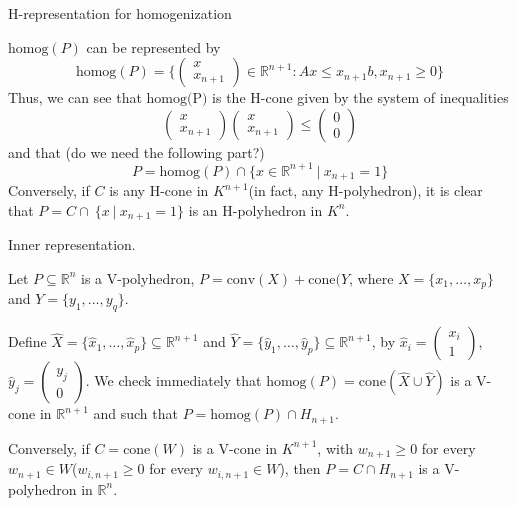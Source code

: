 \documentclass{article}
\def\R{{\mathbb R}}
\begin{document}
H-representation for homogenization

$\mbox{homog}(P)$ can be represented by
\begin{equation}
\mbox{homog}(P)=\{\begin{pmatrix}x\\x_{n+1}\end{pmatrix}\in\R^{n+1}:Ax\leq x_{n+1}b,x_{n+1}\geqslant 0\}
\end{equation}
Thus, we can see that $\mbox{homog(P)}$ is the H-cone given by the system of inequalities 
\begin{equation}
\begin{pmatrix}x\\x_{n+1}\end{pmatrix}\begin{pmatrix}x\\x_{n+1}\end{pmatrix}\leqslant \begin{pmatrix}0\\0\end{pmatrix}
\end{equation}
and that (do we need the following part?)
\begin{equation}
P=\mbox{homog}(P)\cap \{x\in\R^{n+1}~|~x_{n+1}=1\}
\end{equation}
Conversely, if $C$ is any H-cone in $K^{n+1}$(in fact, any H-polyhedron), it is clear that $P=C\cap\ \{x~|~x_{n+1}=1\}$ is an H-polyhedron in $K^n$.


Inner representation.

Let $P\subseteq\R^n$ is a V-polyhedron, $P=\mbox{conv}(X)+\mbox{cone}(Y$, where $X=\{x_1,\dots,x_p\}$ and $Y=\{y_1,\dots, y_q\}$.

Define $\hat{X}=\{\hat{x}_1,\dots,\hat{x}_p\}\subseteq\R^{n+1}$ and $\hat{Y}=\{\hat{y}_1,\dots,\hat{y}_p\}\subseteq\R^{n+1}$, by
$\hat{x}_i=\begin{pmatrix}x_i\\1\end{pmatrix}$, $\hat{y}_j=\begin{pmatrix}y_j\\0\end{pmatrix}$.
We check immediately that 
$\mbox{homog}(P)=\mbox{cone}(\hat{X}\cup\hat{Y})$ is a V-cone in $\R^{n+1}$ and such that 
$P=\mbox{homog}(P)\cap H_{n+1}$.

Conversely, if $C=\mbox{cone}(W)$ is a V-cone in $K^{n+1}$, with $w_{n+1}\geqslant 0$ for every $w_{n+1}\in W$($w_{i,n+1}\geqslant 0$ for every $w_{i,n+1}\in W$), then $P=C\cap H_{n+1}$ is a V-polyhedron in $\R^n$.
\end{document}
